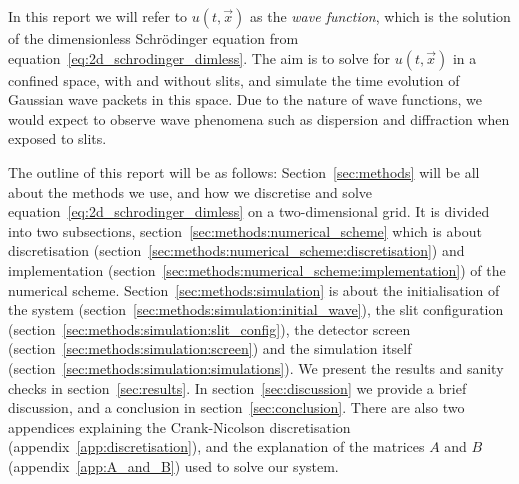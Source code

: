 In this report we will refer to $u(t, \vec{x})$ as the \textit{wave function}, which is the solution of the dimensionless Schrödinger equation from equation~\eqref{eq:2d_schrodinger_dimless}. The aim is to solve for $u(t,\vec{x})$ in a confined space, with and without slits, and simulate the time evolution of Gaussian wave packets in this space. Due to the nature of wave functions, we would expect to observe wave phenomena such as dispersion and diffraction when exposed to slits. 

The outline of this report will be as follows: Section~\ref{sec:methods} will be all about the methods we use, and how we discretise and solve equation~\eqref{eq:2d_schrodinger_dimless} on a two-dimensional grid. It is divided into two subsections, section~\ref{sec:methods:numerical_scheme} which is about discretisation (section~\ref{sec:methods:numerical_scheme:discretisation}) and implementation (section~\ref{sec:methods:numerical_scheme:implementation}) of the numerical scheme. Section~\ref{sec:methods:simulation} is about the initialisation of the system (section~\ref{sec:methods:simulation:initial_wave}), the slit configuration (section~\ref{sec:methods:simulation:slit_config}), the detector screen (section~\ref{sec:methods:simulation:screen}) and the simulation itself (section~\ref{sec:methods:simulation:simulations}). We present the results and sanity checks in section~\ref{sec:results}. In section~\ref{sec:discussion} we provide a brief discussion, and a conclusion in section~\ref{sec:conclusion}. There are also two appendices explaining the Crank-Nicolson discretisation (appendix~\ref{app:discretisation}), and the explanation of the matrices $A$ and $B$ (appendix~\ref{app:A_and_B}) used to solve our system. 



